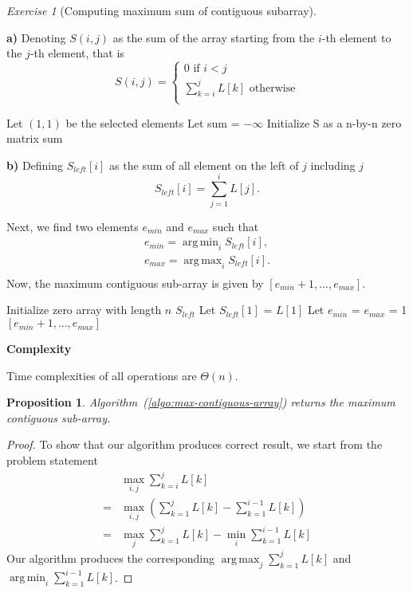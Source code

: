 \documentclass[a4paper,10pt,twoside]{article}
\DeclareMathOperator*{\argmin}{arg\,min}
\DeclareMathOperator*{\argmax}{arg\,max}
\theoremstyle{plain}
\newtheorem{proposition}{Proposition}
\theoremstyle{definition}
\theoremstyle{remark}
\theoremstyle{exercise}
\newtheorem{exercise}{Exercise}
\begin{document}
\begin{exercise}[Computing maximum sum of contiguous subarray]\

\textbf{a)} Denoting $S(i, j)$ as the sum of the array starting
from the $i$-th element to the $j$-th element, that is
\[
	S(i, j) = \begin{cases}
		0 \text{ if $i < j$}\\
		\sum_{k=i}^j L[k] \text{ otherwise}\\
	\end{cases}
\]
\begin{algorithm}[H]
	\caption{Naive summation}
	Let $(1, 1)$ be the selected elements\;
	Let sum = $-\infty$ \;
	Initialize S as a n-by-n zero matrix\;
	\Return sum
\end{algorithm}
\textbf{b)} Defining $S_{left}[i]$
as the sum of all element on the left of $j$ including $j$
\[
	S_{left}[i] = \sum_{j=1}^i L[j].
\]

Next, we find two elements $e_{min}$ and $e_{max}$ such that
\[
\begin{aligned}
	e_{min} = \argmin_i S_{left}[i],\\
	e_{max} = \argmax_i S_{left}[i].\\
\end{aligned}
\]
Now, the maximum contiguous sub-array is given by $[e_{min}+1,...,e_{max}]$.

\begin{algorithm}[H]
\label{algo:max-contiguous-array}
\caption{Find maximum contiguous array(L)}
Initialize zero array with length $n$ $S_{left}$\;
Let $S_{left}[1]$ = $L[1]$\;
Let $e_{min}$ = $e_{max}$ = 1\;
\Return $[e_{min} +1, ..., e_{max}]$
\end{algorithm}

\textbf{Complexity}

Time complexities of all operations are $\Theta(n)$.

\begin{proposition}
Algorithm~(\ref{algo:max-contiguous-array}) returns the maximum contiguous
sub-array.
\end{proposition}

\begin{proof}
To show that our algorithm produces correct result, we start from the
problem statement
\[
	\begin{aligned}
	&\max_{i, j} \sum_{k=i}^j L[k] \\
	=&\max_{i, j} \left( \sum_{k=1}^j L[k] - \sum_{k=1}^{i-1} L[k] \right)\\
	=&\max_{j} \sum_{k=1}^j L[k] - \min_{i}\sum_{k=1}^{i-1} L[k] 
	\end{aligned}
\]
Our algorithm produces the corresponding $\argmax_j\sum_{k=1}^j L[k]$ 
and $\argmin_i\sum_{k=1}^{i-1} L[k]$.
\end{proof}
\end{exercise}
\end{document}
